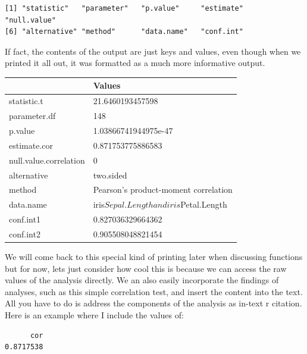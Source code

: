 \documentclass[
  letterpaper,
]{book}
\newenvironment{Shaded}{\begin{snugshade}}{\end{snugshade}}
\newcommand{\NormalTok}[1]{\textcolor[rgb]{0.00,0.23,0.31}{#1}}
\newcommand{\SpecialCharTok}[1]{\textcolor[rgb]{0.37,0.37,0.37}{#1}}
\newcounter{none} %
\begin{document}
\begin{verbatim}
[1] "statistic"   "parameter"   "p.value"     "estimate"    "null.value" 
[6] "alternative" "method"      "data.name"   "conf.int"   
\end{verbatim}

If fact, the contents of the output are just keys and values, even
though when we printed it all out, it was formatted as a much more
informative output.

{\def\LTcaptype{none} %
\begin{longtable}[]{@{}ll@{}}
\toprule\noalign{}
& Values \\
\midrule\noalign{}
\endhead
\bottomrule\noalign{}
\endlastfoot
statistic.t & 21.6460193457598 \\
parameter.df & 148 \\
p.value & 1.03866741944975e-47 \\
estimate.cor & 0.871753775886583 \\
null.value.correlation & 0 \\
alternative & two.sided \\
method & Pearson's product-moment correlation \\
data.name & iris\(Sepal.Length and iris\)Petal.Length \\
conf.int1 & 0.827036329664362 \\
conf.int2 & 0.905508048821454 \\
\end{longtable}
}

We will come back to this special kind of printing later when discussing
functions but for now, lets just consider how cool this is because we
can access the raw values of the analysis directly. We an also easily
incorporate the findings of analyses, such as this simple correlation
test, and insert the content into the text. All you have to do is
address the components of the analysis as in-text r citation. Here is an
example where I include the values of:

\begin{Shaded}
\end{Shaded}

\begin{verbatim}
      cor 
0.8717538 
\end{verbatim}

\begin{Shaded}
\end{Shaded}
\end{document}
